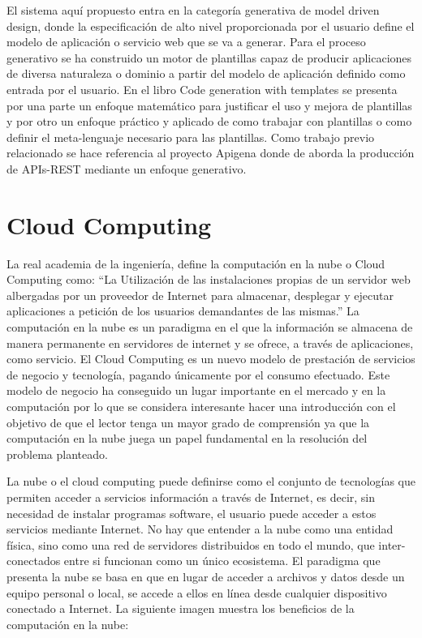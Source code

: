 \documentclass[a4paper,11pt]{book}
\begin{document}
El sistema aquí propuesto entra en la categoría generativa de model driven design, donde la especificación de alto nivel proporcionada por el usuario define el modelo de aplicación o servicio web  que se va a generar. Para el proceso generativo se ha construido un motor de plantillas capaz de producir aplicaciones de diversa naturaleza o dominio a partir del modelo de aplicación definido como entrada por el usuario.  En el libro Code generation with templates\cite{templates} se presenta por una parte un enfoque matemático para justificar el uso y mejora de plantillas y por otro un enfoque práctico y aplicado de como trabajar con plantillas o como definir el meta-lenguaje necesario para las plantillas.  Como trabajo previo relacionado se hace referencia al proyecto Apigena\cite{apigena} donde de aborda la producción de APIs-REST mediante un enfoque generativo. 

\section{Cloud Computing}

La real academia de la ingeniería, define la computación en la nube o Cloud Computing\citep{realacademia}  como: “La Utilización de las instalaciones propias de un servidor web albergadas por un proveedor de Internet\cite{latexcompanion} para almacenar, desplegar y ejecutar aplicaciones a petición de los usuarios demandantes de las mismas.” La computación en la nube es un paradigma en el que la información se almacena de manera permanente en servidores de internet y se ofrece, a través de aplicaciones, como servicio. El Cloud Computing es un nuevo modelo de prestación de servicios\cite{magazine} de negocio y tecnología, pagando únicamente por el consumo efectuado. Este modelo de negocio ha conseguido un lugar importante en el mercado y en la computación  por lo que se considera  interesante hacer una introducción con el objetivo de que el lector tenga un mayor grado de comprensión ya que la computación en la nube juega un papel fundamental en la resolución  del problema planteado.

La nube  o el cloud computing  puede definirse  como el conjunto de tecnologías que permiten acceder a servicios información a través de Internet, es decir, sin necesidad de instalar programas software, el usuario puede acceder a estos servicios mediante Internet. No hay que entender a la nube como una entidad física, sino como una red de servidores distribuidos en todo el mundo, que inter-conectados entre si funcionan como un único ecosistema.  El paradigma que presenta la nube se basa en que en lugar de acceder a archivos y datos desde un equipo personal o local, se accede a ellos en línea desde cualquier dispositivo conectado a Internet. La siguiente imagen muestra los beneficios de la computación en la nube:
\end{document}
